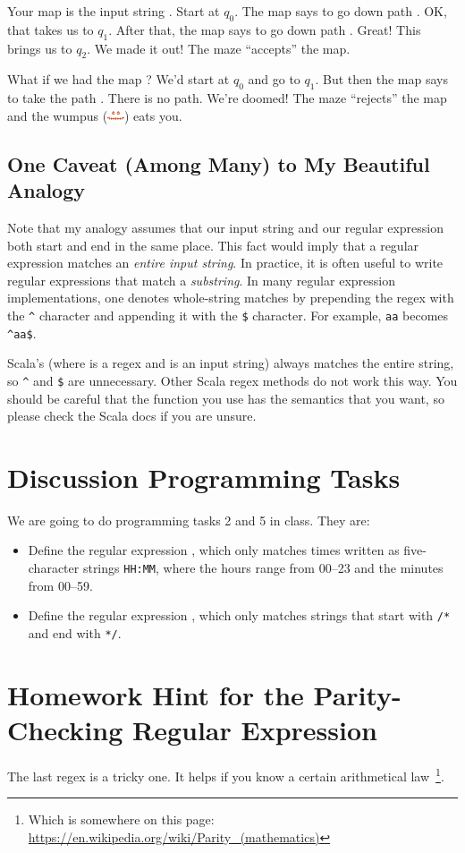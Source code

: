 \documentclass[9pt]{extbook}
\begin{document}
Your map is the input string .  Start at $q_0$.  The map says to go down path .  OK, that takes us to $q_1$.  After that, the map says to go down path .  Great!  This brings us to $q_2$.  We made it out!  The maze ``accepts'' the map.

What if we had the map ?  We'd start at $q_0$ and go to $q_1$.  But then the map says to take the path .  There is no  path.  We're doomed! The maze ``rejects'' the map and the wumpus (\includegraphics[width=0.5cm]{wumpus.jpg}) eats you.

\subsection{One Caveat (Among Many) to My Beautiful Analogy}

Note that my analogy assumes that our input string and our regular expression both start and end in the same place.  This fact would imply that a regular expression matches an \emph{entire input string}.  In practice, it is often useful to write regular expressions that match a \emph{substring}.  In many regular expression implementations, one denotes whole-string matches by prepending the regex with the \texttt{\^{}} character and appending it with the \texttt{\$} character.  For example, \texttt{aa} becomes \texttt{\^{}aa\$}.

Scala's  (where  is a regex and  is an input string) always matches the entire string, so \texttt{\^{}} and \texttt{\$} are unnecessary.  Other Scala regex methods do not work this way.  You should be careful that the function you use has the semantics that you want, so please check the Scala docs if you are unsure.

\section{Discussion Programming Tasks}

We are going to do programming tasks 2 and 5 in class.  They are:

\begin{itemize}

  \item Define the regular expression , which only matches times written as five-character strings \texttt{HH:MM}, where the hours range from 00--23 and the minutes from 00--59.
 
  \item Define the regular expression , which only matches strings that start with \texttt{/*} and end with \texttt{*/}.

\end{itemize}

\section{Homework Hint for the Parity-Checking Regular Expression}

The last regex is a tricky one.  It helps if you know a certain arithmetical law~\footnote{Which is somewhere on this page: \url{https://en.wikipedia.org/wiki/Parity_(mathematics)}}.




\end{document}

